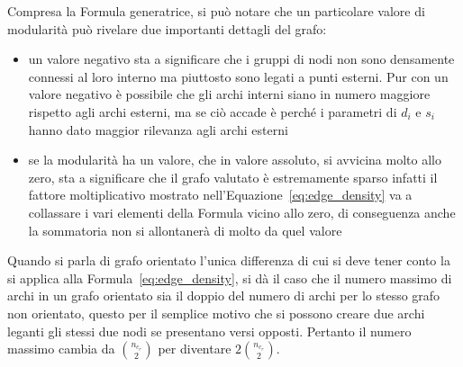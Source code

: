 Compresa la Formula generatrice, si può notare che un particolare valore di modularità può rivelare  due importanti dettagli del grafo:
\begin{itemize}
	\item un valore negativo sta a significare che i gruppi di nodi non sono densamente connessi al loro interno ma piuttosto sono legati a punti esterni. Pur con un valore negativo è possibile che gli archi interni siano in numero maggiore rispetto agli archi esterni, ma se ciò accade è perché i parametri di $d_i$ e $s_i$ hanno dato maggior rilevanza agli archi esterni
	\item se la modularità ha un valore, che in valore assoluto, si avvicina molto allo zero, sta a significare che il grafo valutato è estremamente sparso infatti il fattore moltiplicativo mostrato nell'Equazione~\ref{eq:edge_density} va a collassare i vari elementi della Formula vicino allo zero, di conseguenza anche la sommatoria non si allontanerà di molto da quel valore
\end{itemize}
Quando si parla di grafo orientato l'unica differenza di cui si deve tener conto la si applica alla Formula~\ref{eq:edge_density}, si dà il caso che il numero massimo di archi in un grafo orientato sia il doppio del numero di archi per lo stesso grafo non orientato, questo per il semplice motivo che si possono creare due archi leganti gli stessi due nodi se presentano versi opposti. Pertanto il numero massimo cambia da $\displaystyle\binom{n_{c_r}}{2}$ per diventare $\displaystyle 2\binom{n_{c_r}}{2}$.
%
%
